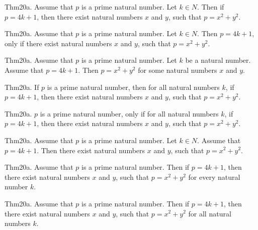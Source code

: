 \documentclass{article}
\begin{document}
Thm20a. Assume that $p$ is a prime natural number. Let $k \in N$. Then if $p = 4 k + 1$, then there exist natural numbers $x$ and $y$, such that $p = x ^{ 2}+ y ^{ 2}$.

Thm20a. Assume that $p$ is a prime natural number. Let $k \in N$. Then $p = 4 k + 1$, only if there exist natural numbers $x$ and $y$, such that $p = x ^{ 2}+ y ^{ 2}$.

Thm20a. Assume that $p$ is a prime natural number. Let $k$ be a natural number. Assume that $p = 4 k + 1$. Then $p = x ^{ 2}+ y ^{ 2}$ for some natural numbers $x$ and $y$.

Thm20a. If $p$ is a prime natural number, then for all natural numbers $k$, if $p = 4 k + 1$, then there exist natural numbers $x$ and $y$, such that $p = x ^{ 2}+ y ^{ 2}$.

Thm20a. $p$ is a prime natural number, only if for all natural numbers $k$, if $p = 4 k + 1$, then there exist natural numbers $x$ and $y$, such that $p = x ^{ 2}+ y ^{ 2}$.

Thm20a. Assume that $p$ is a prime natural number. Let $k \in N$. Assume that $p = 4 k + 1$. Then there exist natural numbers $x$ and $y$, such that $p = x ^{ 2}+ y ^{ 2}$.

Thm20a. Assume that $p$ is a prime natural number. Then if $p = 4 k + 1$, then there exist natural numbers $x$ and $y$, such that $p = x ^{ 2}+ y ^{ 2}$ for every natural number $k$.

Thm20a. Assume that $p$ is a prime natural number. Then if $p = 4 k + 1$, then there exist natural numbers $x$ and $y$, such that $p = x ^{ 2}+ y ^{ 2}$ for all natural numbers $k$.
\end{document}
